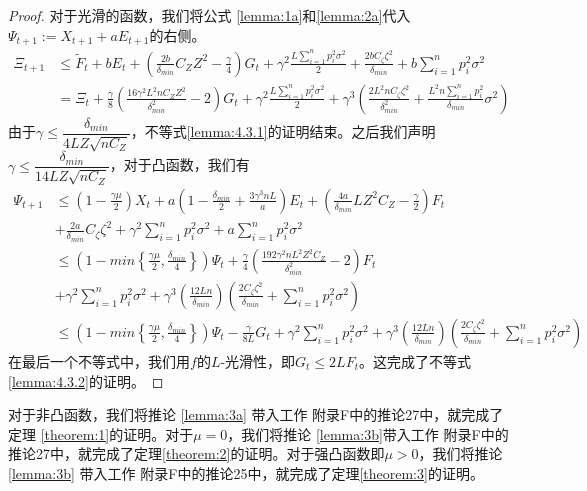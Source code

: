 \begin{proof}
对于光滑的函数，我们将公式 \ref{lemma:1a}和\ref{lemma:2a}代入$\Psi_{t+1} := X_{t+1} +a E_{t+1}$的右侧。
\begin{equation}
\begin{split}
    \Xi_{t+1} 
             &\leq \tilde{F}_t + b E_t +(\frac{2b}{\delta_{min}}C_Z Z^2 - \frac{\gamma}{4})G_t + \gamma^2 \frac{L\sum_{i=1}^n p_i^2 \sigma^2}{2}+\frac{2b C_{\zeta} \zeta^2}{\delta_{min}} + b\sum_{i=1}^n p_i^2\sigma^2 \\
             &= \Xi_{t} + \frac{\gamma}{8}(\frac{16\gamma^2 L^2 n C_Z Z^2}{\delta_{min}^2} - 2)G_t +\gamma^2 \frac{L\sum_{i=1}^n p_i^2 \sigma^2}{2} + \gamma^3 (\frac{2L^2 n C_{\zeta}\zeta^2}{\delta_{min}^2}+\frac{L^2 n \sum_{i=1}^n p_i^2}{\delta_{min}}\sigma^2 )\nonumber
\end{split}
\end{equation}
由于$\gamma \leq \dfrac{\delta_{min}}{4L Z \sqrt{n C_Z }}$，不等式\ref{lemma:4.3.1}的证明结束。之后我们声明$\gamma \leq \dfrac{\delta_{min}}{14 L Z \sqrt{ n C_{Z}}}$，对于凸函数，我们有
\begin{equation}
\begin{split}
    \Psi_{t+1} &\leq (1-\frac{\gamma \mu}{2})X_t +a(1-\frac{\delta_{min}}{2}+\frac{3\gamma^3 n L}{a})E_t + (\frac{4a}{\delta_{min}} L Z^2C_Z - \frac{\gamma}{2})F_t\\
    &+ \frac{2a}{\delta_{min}}C_{\zeta}\zeta^2 + \gamma^2 \sum_{i=1}^n p_i^2 \sigma^2 +a \sum_{i=1}^n p_i^2 \sigma^2\\
    &\leq (1-min\left\{\frac{\gamma \mu}{2},\frac{\delta_{min}}{4}\right\})\Psi_t + \frac{\gamma}{4} (\frac{192\gamma^2 n L^2 Z^2 C_Z}{\delta_{min}^2}-2)F_t \\
    &+ \gamma^2 \sum_{i=1}^n p_i^2 \sigma^2 + \gamma ^3(\frac{12 L n}{\delta_{min}}) (\frac{2 C_{\zeta} \zeta ^2}{\delta_{min}}+\sum_{i=1}^n p_i^2\sigma^2) \\
    &\leq (1-min\left\{\frac{\gamma \mu}{2},\frac{\delta_{min}}{4}\right\})\Psi_{t} - \frac{\gamma}{8L}G_t + \gamma ^2\sum_{i=1}^n p_i^2 \sigma ^2 + \gamma ^3(\frac{12 L n}{\delta_{min}}) (\frac{2 C_{\zeta} \zeta ^2}{\delta_{min}}+\sum_{i=1}^n p_i^2\sigma^2) \nonumber
\end{split}
\end{equation}
在最后一个不等式中，我们用$f$的$L$-光滑性，即$G_t \leq 2L F_t$。这完成了不等式 \ref{lemma:4.3.2}的证明。
\end{proof}

对于非凸函数，我们将推论 \ref{lemma:3a} 带入工作 \cite{stich2020communication}附录F中的推论27中，就完成了定理 \ref{theorem:1}的证明。对于$\mu = 0$，我们将推论 \ref{lemma:3b}带入工作 \cite{stich2020communication}附录F中的推论27中，就完成了定理\ref{theorem:2}的证明。对于强凸函数即$\mu > 0$，我们将推论 \ref{lemma:3b} 带入工作 \cite{stich2020communication}附录F中的推论25中，就完成了定理\ref{theorem:3}的证明。

